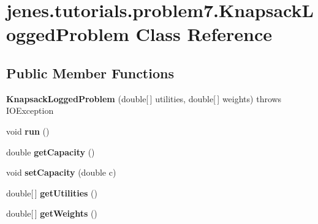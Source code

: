 \hypertarget{classjenes_1_1tutorials_1_1problem7_1_1_knapsack_logged_problem}{
\section{jenes.tutorials.problem7.KnapsackLoggedProblem Class Reference}
\label{classjenes_1_1tutorials_1_1problem7_1_1_knapsack_logged_problem}
}
\subsection*{Public Member Functions}
\begin{CompactItemize}
\item 
\hypertarget{classjenes_1_1tutorials_1_1problem7_1_1_knapsack_logged_problem_0ab9bce9861fb1a721cb682910fec3dc}{
\textbf{KnapsackLoggedProblem} (double\mbox{[}$\,$\mbox{]} utilities, double\mbox{[}$\,$\mbox{]} weights)  throws IOException }
\label{classjenes_1_1tutorials_1_1problem7_1_1_knapsack_logged_problem_0ab9bce9861fb1a721cb682910fec3dc}

\item 
\hypertarget{classjenes_1_1tutorials_1_1problem7_1_1_knapsack_logged_problem_433dd1c6435246eec5fdead858ef3237}{
void \textbf{run} ()}
\label{classjenes_1_1tutorials_1_1problem7_1_1_knapsack_logged_problem_433dd1c6435246eec5fdead858ef3237}

\item 
\hypertarget{classjenes_1_1tutorials_1_1problem7_1_1_knapsack_logged_problem_dac9e9311a429d0c41e8d4c9d7a1afb6}{
double \textbf{getCapacity} ()}
\label{classjenes_1_1tutorials_1_1problem7_1_1_knapsack_logged_problem_dac9e9311a429d0c41e8d4c9d7a1afb6}

\item 
\hypertarget{classjenes_1_1tutorials_1_1problem7_1_1_knapsack_logged_problem_7aad6283e4dcd58ee08550a6682c747d}{
void \textbf{setCapacity} (double c)}
\label{classjenes_1_1tutorials_1_1problem7_1_1_knapsack_logged_problem_7aad6283e4dcd58ee08550a6682c747d}

\item 
\hypertarget{classjenes_1_1tutorials_1_1problem7_1_1_knapsack_logged_problem_a5a5916fe82cdf200e5f9210d673dc35}{
double\mbox{[}$\,$\mbox{]} \textbf{getUtilities} ()}
\label{classjenes_1_1tutorials_1_1problem7_1_1_knapsack_logged_problem_a5a5916fe82cdf200e5f9210d673dc35}

\item 
\hypertarget{classjenes_1_1tutorials_1_1problem7_1_1_knapsack_logged_problem_23b4289088720e543640ae4f1743a129}{
double\mbox{[}$\,$\mbox{]} \textbf{getWeights} ()}
\label{classjenes_1_1tutorials_1_1problem7_1_1_knapsack_logged_problem_23b4289088720e543640ae4f1743a129}

\end{CompactItemize}
